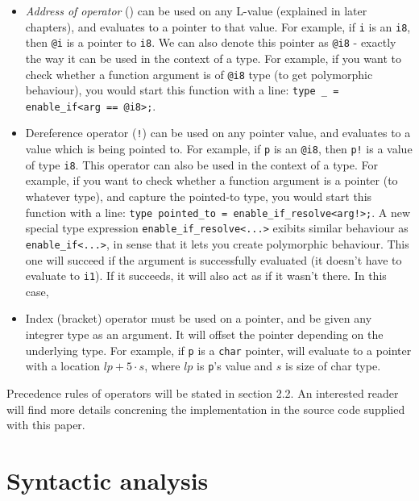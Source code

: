 \documentclass[times, utf8, diplomski]{fer}
\theoremstyle{definition}
\begin{document}
\begin{itemize}
    \item \textit{Address of operator} () can be used on any L-value (explained
        in later chapters), and evaluates to a pointer to that value. For
        example, if \texttt{i} is an \texttt{i8}, then \texttt{@i} is a pointer
    to \texttt{i8}. We can also denote this pointer as \texttt{@i8} - exactly the way it can be used in 
    the context of a type. For example, if you want to check whether a function argument is of \texttt{@i8}
    type (to get polymorphic behaviour), you would start this function with a line:
    \texttt{type \_ = enable\_if<arg == @i8>;}.

    \item Dereference operator (\texttt{!}) can be used on any pointer value, 
        and evaluates to a value which is being pointed to.
        For example, if \texttt{p} is an \texttt{@i8}, then \texttt{p!} is a value of type \texttt{i8}.
    This operator can also be used in the context of a type.
    For example, if you want to check whether a function argument is a pointer (to whatever type), 
    and capture the pointed-to type, you would start this function with a line:
    \texttt{type pointed\_to = enable\_if\_resolve<arg!>;}.
    A new special type expression \texttt{enable\_if\_resolve<...>} exibits similar behaviour as
    \texttt{enable\_if<...>}, in sense that it lets you create polymorphic behaviour. This one will
    succeed if the argument is successfully evaluated (it doesn't have to evaluate to \texttt{i1}).
    If it succeeds, it will also act as if it wasn't there. In this case, 


    \item Index (bracket) operator must be used on a pointer, and be given any integrer type as an argument.
        It will offset the pointer depending on the underlying type. For example, 
        if \texttt{p} is a \texttt{char} pointer,  will evaluate to a pointer 
        with a location $lp+5\cdot s$, where $lp$ is \texttt{p}'s value and $s$ is size of char type.
\end{itemize}

Precedence rules of operators will be stated in section 2.2. 
An interested reader will find more details concrening the implementation in
the source code supplied with this paper.


\section{Syntactic analysis}
\end{document}

